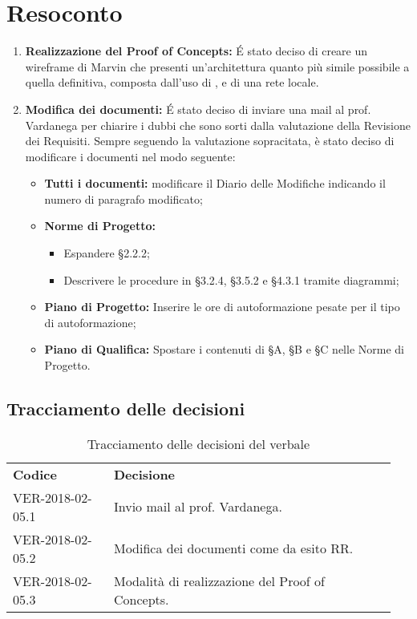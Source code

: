 \documentclass[VER-2018-05-02.tex]{subfiles}
\begin{document}
\chapter{Resoconto}
\begin{enumerate}
	\item \textbf{Realizzazione del Proof of Concepts:} \'{E} stato deciso di creare un wireframe di Marvin che presenti un'architettura quanto più simile possibile a quella definitiva, composta dall'uso di ,  e di una rete  locale.
	\item \textbf{Modifica dei documenti:} \'{E} stato deciso di inviare una mail al prof. Vardanega per chiarire i dubbi che sono sorti dalla valutazione della Revisione dei Requisiti.
	Sempre seguendo la valutazione sopracitata, è stato deciso di modificare i documenti nel modo seguente:
	\begin{itemize}
		\item \textbf{Tutti i documenti:} modificare il Diario delle Modifiche indicando il numero di paragrafo modificato;
		\item \textbf{Norme di Progetto:} \begin{itemize}
										     \item Espandere \S 2.2.2;
										     \item Descrivere le procedure in \S 3.2.4, \S 3.5.2 e \S 4.3.1 tramite diagrammi;
								           \end{itemize}
      \item \textbf{Piano di Progetto:} Inserire le ore di autoformazione pesate per il tipo di autoformazione;
      \item\textbf{Piano di Qualifica:} Spostare i contenuti di \S A, \S B e \S C nelle Norme di Progetto.
	\end{itemize}
\end{enumerate}

\section{Tracciamento delle decisioni}
\begin{table}[H]
	\begin{center}
		\begin{tabu} to 
			\tableHeaderStyle
			\textbf{Codice} & \textbf{Decisione} \\
			VER-2018-02-05.1 & Invio mail al prof. Vardanega. \\
			VER-2018-02-05.2 & Modifica dei documenti come da esito RR. \\
			VER-2018-02-05.3 & Modalità di realizzazione del Proof of Concepts. \\
		\end{tabu}
		\caption{Tracciamento delle decisioni del verbale}
	\end{center}
\end{table}
\end{document}
